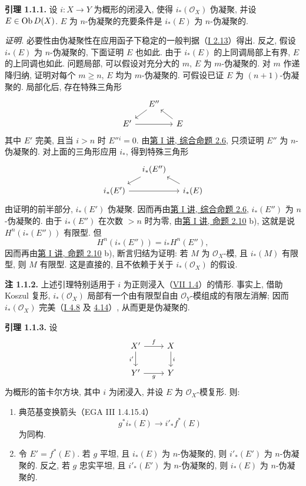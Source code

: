 \textbf{引理 1.1.1.} 设 \(i:X\to Y\) 为概形的闭浸入, 使得 \(i_*(\mathcal O_X)\) 伪凝聚, 并设 \(E\in \operatorname{Ob} D(X)\). \(E\) 为 \(n\)-伪凝聚的充要条件是 \(i_*(E)\) 为 \(n\)-伪凝聚的.

\emph{证明.} 必要性由伪凝聚性在应用函子下稳定的一般判据（\hyperlink{sga6.e01.prop.2-13}{I 2.13}）得出. 反之, 假设 \(i_*(E)\) 为 \(n\)-伪凝聚的, 下面证明 \(E\) 也如此. 由于 \(i_*(E)\) 的上同调局部上有界, \(E\) 的上同调也如此. 问题局部, 可以假设对充分大的 \(m\), \(E\) 为 \(m\)-伪凝聚的. 对 \(m\) 作递降归纳, 证明对每个 \(m\geq n\), \(E\) 均为 \(m\)-伪凝聚的. 可假设已证 \(E\) 为 \((n+1)\)-伪凝聚的. 局部化后, 存在特殊三角形
\[
\begin{tikzcd}[column sep=small,row sep=small]
&E''\arrow[dl]&\\
E'\arrow[rr]&&E\arrow[ul]
\end{tikzcd}
\]
其中 \(E'\) 完美, 且当 \(i>n\) 时 \(E''{}^i=0\). 由\hyperlink{sga6.e01.schol.2-6}{第 I 讲, 综合命题 2.6}, 只须证明 \(E''\) 为 \(n\)-伪凝聚的. 对上面的三角形应用 \(i_*\), 得到特殊三角形
\[
\begin{tikzcd}[column sep=small,row sep=small]
&i_*(E'')\arrow[dl]&\\
i_*(E')\arrow[rr]&&i_*(E)\arrow[ul]
\end{tikzcd}
\]
由证明的前半部分, \(i_*(E')\) 伪凝聚. 因而再由\hyperlink{sga6.e01.schol.2-6}{第 I 讲, 综合命题 2.6}, \(i_*(E'')\) 为 \(n\)-伪凝聚的. 由于 \(i_*(E'')\) 在次数 \(>n\) 时为零, 由\hyperlink{sga6.e01.prop.2-10}{第 I 讲, 命题 2.10} b), 这就是说 \(H^n(i_*(E''))\) 有限型. 但
\[
  H^n(i_*(E''))=i_*H^n(E''),
\]
因而再由\hyperlink{sga6.e01.prop.2-10}{第 I 讲, 命题 2.10} b), 断言归结为证明: 若 \(M\) 为 \(\mathcal O_X\)-模, 且 \(i_*(M)\) 有限型, 则 \(M\) 有限型. 这是直接的, 且不依赖于关于 \(i_*(\mathcal O_X)\) 的假设.

\textbf{注 1.1.2.} 上述引理特别适用于 \(i\) 为正则浸入（\hyperlink{sga6.e07.def.1-4}{VII 1.4}）的情形. 事实上, 借助 Koszul 复形, \(i_*(\mathcal O_X)\) 局部有一个由有限型自由 \(\mathcal O_Y\)-模组成的有限左消解; 因而 \(i_*(\mathcal O_X)\) 完美（\hyperlink{sga6.e01.ex.4-8}{I 4.8} 及 \hyperlink{sga6.e01.cor.4-14}{4.14}）, 从而更是伪凝聚的.

\textbf{引理 1.1.3.} 设
\[
\begin{tikzcd}
X' \arrow[r,"f"] \arrow[d,"i'"'] & X \arrow[d,"i"]\\
Y' \arrow[r,"g"'] & Y
\end{tikzcd}
\]
为概形的笛卡尔方块, 其中 \(i\) 为闭浸入, 并设 \(E\) 为 \(\mathcal O_X\)-模复形. 则:
\begin{enumerate}[label=(\roman*)]
\item 典范基变换箭头（EGA III 1.4.15.4）
\[
  g^*i_*(E)\longrightarrow i'_*f^*(E)
\]
为同构.

\item 令 \(E'=f^*(E)\). 若 \(g\) 平坦, 且 \(i_*(E)\) 为 \(n\)-伪凝聚的, 则 \(i'_*(E')\) 为 \(n\)-伪凝聚的. 反之, 若 \(g\) 忠实平坦, 且 \(i'_*(E')\) 为 \(n\)-伪凝聚的, 则 \(i_*(E)\) 为 \(n\)-伪凝聚的.
\end{enumerate}

